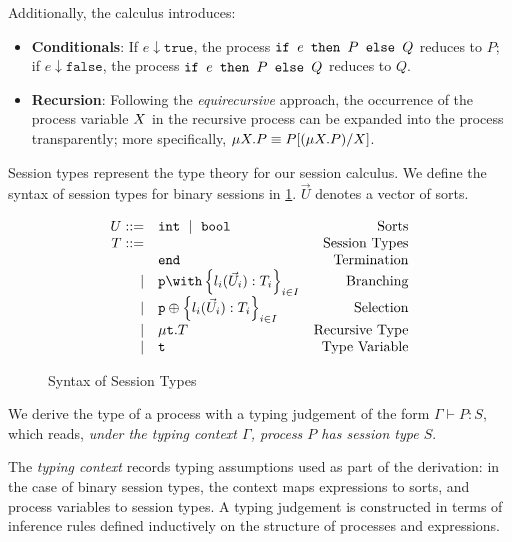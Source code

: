 Additionally, the calculus introduces:

\begin{itemize}
\item \textbf{Conditionals}: 
If $e \downarrow \texttt{true}$, 
the process $\texttt{if }{e}\texttt{ then }{P}\texttt{ else }{Q}$ reduces to $P$; 
if $e \downarrow \texttt{false}$, 
the process $\texttt{if }{e}\texttt{ then }{P}\texttt{ else }{Q}$ reduces to $Q$.

\item \textbf{Recursion}: 
Following the \textit{equirecursive} approach, 
the occurrence of the process variable $X$ 
in the recursive process can be 
expanded into the process transparently;
more specifically, $\mu X . {P} \equiv P[(\mu X . {P})/X]$.
\end{itemize}

{Session types} represent the type theory for our session calculus.
We define the syntax of session types for binary sessions in
\cref{fig:bst}. $\vec U$ denotes a vector of sorts.

\begin{figure}[!hb]
\doublespacing
\[
\begin{array}{rlr}

U ::= & \text{\tt{int}}~\mid~\text{\tt{bool}} & \text{Sorts} \\

T ::= & & \text{Session Types} \\
     & \tend & \text{Termination} \\
\mid & \tbra{p}{l_i(\vec U_i):T_i}{i\in I} & \text{Branching} \\
\mid & \tsel{p}{l_i(\vec U_i):T_i}{i\in I} & \text{Selection} \\
\mid & \trec{T} & \text{Recursive Type} \\
\mid & \trecvar & \text{Type Variable} \\
\end{array}
\]

\singlespacing
\caption{Syntax of Session Types}
\label{fig:bst}
\end{figure}

We derive the type of a process with a {typing judgement} 
of the form $\Gamma \vdash P: S$, which reads, 
\textit{under the typing context $\Gamma$, 
process $P$ has session type $S$}. 

The \textit{typing context} records typing assumptions 
used as part of the derivation: in the case of binary session types, 
the context maps expressions to sorts, 
and process variables to session types. 
A typing judgement is constructed in terms of inference rules 
defined inductively on the structure of 
processes and expressions.

